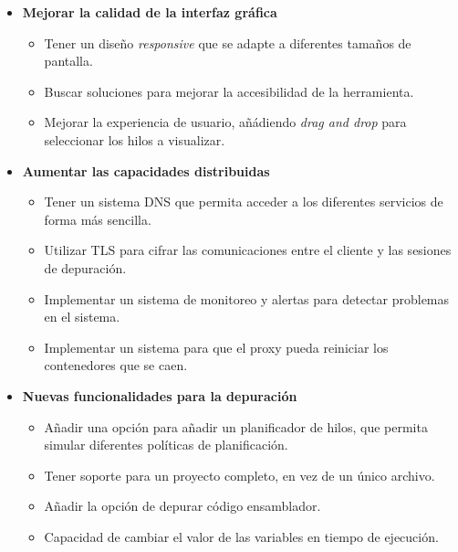 \begin{itemize}
    \item \textbf{Mejorar la calidad de la interfaz gráfica}
    \begin{itemize}
        \item Tener un diseño \textit{responsive} que se adapte a diferentes tamaños de pantalla.
        \item Buscar soluciones para mejorar la accesibilidad de la herramienta.
        \item Mejorar la experiencia de usuario, añádiendo \textit{drag and drop} para seleccionar los hilos a visualizar.
    \end{itemize}
    \item \textbf{Aumentar las capacidades distribuidas}
    \begin{itemize}
        \item Tener un sistema DNS que permita acceder a los diferentes servicios de forma más sencilla.
        \item Utilizar TLS para cifrar las comunicaciones entre el cliente y las sesiones de depuración.
        \item Implementar un sistema de monitoreo y alertas para detectar problemas en el sistema.
        \item Implementar un sistema para que el proxy pueda reiniciar los contenedores que se caen.
    \end{itemize}
    \item \textbf{Nuevas funcionalidades para la depuración}
    \begin{itemize}
        \item Añadir una opción para añadir un planificador de hilos, que permita simular diferentes políticas de planificación.
        \item Tener soporte para un proyecto completo, en vez de un único archivo.
        \item Añadir la opción de depurar código ensamblador.
        \item Capacidad de cambiar el valor de las variables en tiempo de ejecución.
    \end{itemize}
\end{itemize}
